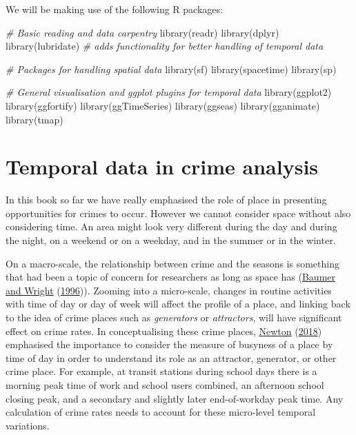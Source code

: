 \documentclass[
]{book}
\makeatletter
\newenvironment{Shaded}{\begin{snugshade}}{\end{snugshade}}
\newcommand{\CommentTok}[1]{\textcolor[rgb]{0.37,0.37,0.37}{\textit{#1}}}
\newcommand{\FunctionTok}[1]{\textcolor[rgb]{0,0,0}{#1}}
\newcommand{\NormalTok}[1]{#1}
\newenvironment{kframe}{%
\medskip{}
\setlength{\fboxsep}{.8em}
 \def\at@end@of@kframe{}%
 \ifinner\ifhmode%
  \def\at@end@of@kframe{\end{minipage}}%
  \begin{minipage}{\columnwidth}%
 \fi\fi%
 \def\FrameCommand##1{\hskip\@totalleftmargin \hskip-\fboxsep
 \colorbox{shadecolor}{##1}\hskip-\fboxsep
     \hskip-\linewidth \hskip-\@totalleftmargin \hskip\columnwidth}%
 \MakeFramed {\advance\hsize-\width
   \@totalleftmargin\z@ \linewidth\hsize
   \@setminipage}}%
 {\par\unskip\endMakeFramed%
 \at@end@of@kframe}
\renewenvironment{Shaded}{\begin{kframe}}{\end{kframe}}
\makeatother
\begin{document}
We will be making use of the following R packages:

\begin{Shaded}
\begin{Highlighting}[]
\CommentTok{\# Basic reading and data carpentry}
\FunctionTok{library}\NormalTok{(readr)}
\FunctionTok{library}\NormalTok{(dplyr)}
\FunctionTok{library}\NormalTok{(lubridate) }\CommentTok{\# adds functionality for better handling of temporal data}

\CommentTok{\# Packages for handling spatial data}
\FunctionTok{library}\NormalTok{(sf)}
\FunctionTok{library}\NormalTok{(spacetime)}
\FunctionTok{library}\NormalTok{(sp)}

\CommentTok{\# General visualisation and ggplot plugins for temporal data}
\FunctionTok{library}\NormalTok{(ggplot2)}
\FunctionTok{library}\NormalTok{(ggfortify)}
\FunctionTok{library}\NormalTok{(ggTimeSeries)}
\FunctionTok{library}\NormalTok{(ggseas)}
\FunctionTok{library}\NormalTok{(gganimate)}
\FunctionTok{library}\NormalTok{(tmap)}
\end{Highlighting}
\end{Shaded}

\hypertarget{temporal-data-in-crime-analysis}{%
\section{Temporal data in crime analysis}\label{temporal-data-in-crime-analysis}}

In this book so far we have really emphasised the role of place in presenting opportunities for crimes to occur. However we cannot consider space without also considering time. An area might look very different during the day and during the night, on a weekend or on a weekday, and in the summer or in the winter.

On a macro-scale, the relationship between crime and the seasons is something that had been a topic of concern for researchers as long as space has (\protect\hyperlink{ref-Baumer_1996}{Baumer and Wright} (\protect\hyperlink{ref-Baumer_1996}{1996})). Zooming into a micro-scale, changes in routine activities with time of day or day of week will affect the profile of a place, and linking back to the idea of crime places such as \emph{generators} or \emph{attractors}, will have significant effect on crime rates. In conceptualising these crime places, \protect\hyperlink{ref-Newton_2018}{Newton} (\protect\hyperlink{ref-Newton_2018}{2018}) emphasised the importance to consider the measure of busyness of a place by time of day in order to understand its role as an attractor, generator, or other crime place. For example, at transit stations during school days there is a morning peak time of work and school users combined, an afternoon school closing peak, and a secondary and slightly later end-of-workday peak time. Any calculation of crime rates needs to account for these micro-level temporal variations.
\end{document}
